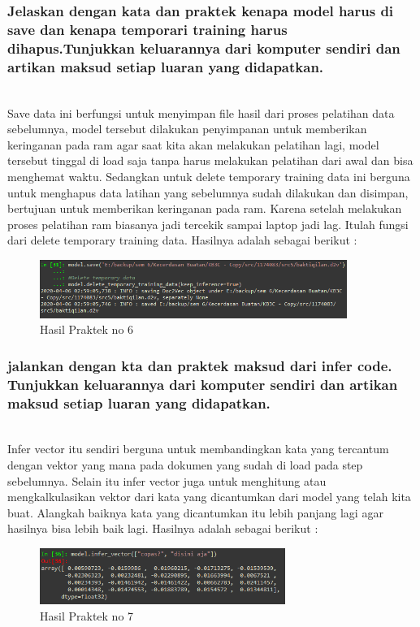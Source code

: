 \subsubsection{Jelaskan dengan kata dan praktek kenapa model harus di save dan kenapa temporari training harus dihapus.Tunjukkan keluarannya dari komputer sendiri dan artikan maksud setiap luaran yang didapatkan.}
\hfill\\

Save data ini berfungsi untuk menyimpan file hasil dari proses pelatihan data sebelumnya, model tersebut dilakukan penyimpanan untuk memberikan keringanan pada ram agar saat kita akan melakukan pelatihan lagi, model tersebut tinggal di load saja tanpa harus melakukan pelatihan dari awal dan bisa menghemat waktu. Sedangkan untuk delete temporary training data ini berguna untuk menghapus data latihan yang sebelumnya sudah dilakukan dan disimpan, bertujuan untuk memberikan keringanan pada ram. Karena setelah melakukan proses pelatihan ram biasanya jadi tercekik sampai laptop jadi lag. Itulah fungsi dari delete temporary training data. Hasilnya adalah sebagai berikut :
\begin{figure}[H]
	\centering
	\includegraphics[width=10cm]{figures/1174083/figures5/42.png}
	\caption{Hasil Praktek no 6}
\end{figure}

\subsubsection{jalankan dengan kta dan praktek maksud dari infer code. Tunjukkan keluarannya dari komputer sendiri dan artikan maksud setiap luaran yang didapatkan.}
\hfill\\

Infer vector itu sendiri berguna untuk membandingkan kata yang tercantum dengan vektor yang mana pada dokumen yang sudah di load pada step sebelumnya. Selain itu infer vector juga untuk menghitung atau mengkalkulasikan vektor dari kata yang dicantumkan dari model yang telah kita buat. Alangkah baiknya kata yang dicantumkan itu lebih panjang lagi agar hasilnya bisa lebih baik lagi. Hasilnya adalah sebagai berikut :
\begin{figure}[H]
	\centering
	\includegraphics[width=8cm]{figures/1174083/figures5/43.png}
	\caption{Hasil Praktek no 7}
\end{figure}

